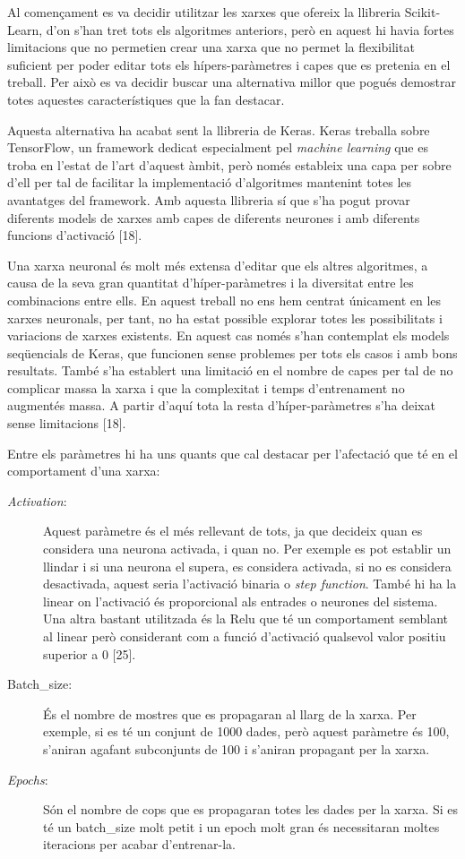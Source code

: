\documentclass[10pt,a4paper,twocolumn,twoside]{article}
\begin{document}
Al començament es va decidir utilitzar les xarxes que ofereix la llibreria Scikit-Learn, d'on s'han tret tots els algoritmes anteriors, però en aquest hi havia fortes limitacions que no permetien crear una xarxa que no permet la flexibilitat suficient per poder editar tots els hípers-paràmetres i capes que es pretenia en el treball. Per això es va decidir buscar una alternativa millor que pogués demostrar totes aquestes característiques que la fan destacar.

Aquesta alternativa ha acabat sent la llibreria de Keras. Keras treballa sobre TensorFlow, un framework dedicat especialment pel \textit{machine learning} que es troba en l'estat de l'art d'aquest àmbit, però només estableix una capa per sobre d'ell per tal de facilitar la implementació d'algoritmes mantenint totes les avantatges del framework. Amb aquesta llibreria sí que s'ha pogut provar diferents models de xarxes amb capes de diferents neurones i amb diferents funcions d'activació [18].

Una xarxa neuronal és molt més extensa d'editar que els altres algoritmes, a causa de la seva gran quantitat d'híper-paràmetres i la diversitat entre les combinacions entre ells. En aquest treball no ens hem centrat únicament en les xarxes neuronals, per tant, no ha estat possible explorar totes les possibilitats i variacions de xarxes existents. En aquest cas només s'han contemplat els models seqüencials de Keras, que funcionen sense problemes per tots els casos i amb bons resultats. També s'ha establert una limitació en el nombre de capes per tal de no complicar massa la xarxa i que la complexitat i temps d'entrenament no augmentés massa. A partir d'aquí tota la resta d'híper-paràmetres s'ha deixat sense limitacions [18].

Entre els paràmetres hi ha uns quants que cal destacar per l'afectació que té en el comportament d'una xarxa:
\begin{description}
\item [\textit{Activation}:] Aquest paràmetre és el més rellevant de tots, ja que decideix quan es considera una neurona activada, i quan no. Per exemple es pot establir un llindar i si una neurona el supera, es considera activada, si no es considera desactivada, aquest seria l'activació binaria o \textit{step function}. També hi ha la linear on l'activació és proporcional als entrades o neurones del sistema. Una altra bastant utilitzada és la Relu que té un comportament semblant al linear però considerant com a funció d'activació qualsevol valor positiu superior a 0 [25].
\item[Batch\_size:] És el nombre de mostres que es propagaran al llarg de la xarxa. Per exemple, si es té un conjunt de 1000 dades, però aquest paràmetre és 100, s'aniran agafant subconjunts de 100 i s'aniran propagant per la xarxa.
\item[\textit{Epochs}:] Són el nombre de cops que es propagaran totes les dades per la xarxa. Si es té un batch\_size molt petit i un epoch molt gran és necessitaran moltes iteracions per acabar d'entrenar-la.
\end{description}
\end{document}
